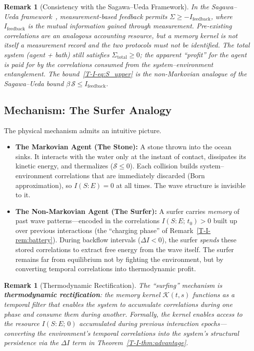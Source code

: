 \documentclass[12pt,a4paper,openany]{book}
\newtheorem{remark}[theorem]{Remark}
\begin{document}
\begin{remark}[Consistency with the Sagawa--Ueda Framework]
\label{T-I-rem:SU_consistency}
In the Sagawa--Ueda framework~\cite{SagawaUeda2010,SagawaUeda2012},
measurement-based feedback permits
$\Sigma \geq -I_{\mathrm{feedback}}$, where
$I_{\mathrm{feedback}}$ is the mutual information gained
through measurement.
Pre-existing correlations are an analogous accounting resource, but a
memory kernel is not itself a measurement record and the two protocols
must not be identified.
The total system (agent + bath) still satisfies
$\Sigma_{\mathrm{total}} \geq 0$; the apparent ``profit'' for
the agent is paid for by the correlations consumed from the
system--environment entanglement.
The bound~\eqref{T-I-eq:S_upper} is the non-Markovian analogue of
the Sagawa--Ueda bound $\beta\,\mathcal{S} \leq
I_{\mathrm{feedback}}$.
\end{remark}

\subsection{Mechanism: The Surfer Analogy}

The physical mechanism admits an intuitive picture.

\begin{itemize}
\item \textbf{The Markovian Agent (The Stone):}
A stone thrown into the ocean sinks.
It interacts with the water only at the instant of contact,
dissipates its kinetic energy, and thermalizes
($\mathcal{S} \leq 0$).
Each collision builds system--environment correlations that are
immediately discarded (Born approximation), so
$I(S{:}E) = 0$ at all times.
The wave structure is invisible to it.

\item \textbf{The Non-Markovian Agent (The Surfer):}
A surfer carries \emph{memory} of past wave patterns---encoded
in the correlations $I(S{:}E;\, t_0) > 0$ built up over
previous interactions (the ``charging phase'' of
Remark~\ref{T-I-rem:battery}).
During backflow intervals ($\Delta I < 0$), the surfer
\emph{spends} these stored correlations to extract free energy
from the wave itself.
The surfer remains far from equilibrium not by fighting the
environment, but by converting temporal correlations into
thermodynamic profit.
\end{itemize}

\begin{remark}[Thermodynamic Rectification]
\label{T-I-rem:rectification}
The ``surfing'' mechanism is \textbf{thermodynamic
rectification}: the memory kernel $\mathcal{K}(t,s)$ functions
as a temporal filter that enables the system to accumulate
correlations during one phase and consume them during another.
Formally, the kernel enables access to the resource
$I(S{:}E;\, 0)$ accumulated during previous interaction
epochs---converting the environment's temporal correlations
into the system's structural persistence via the
$\Delta I$ term in Theorem~\ref{T-I-thm:advantage}.
\end{remark}
\end{document}
